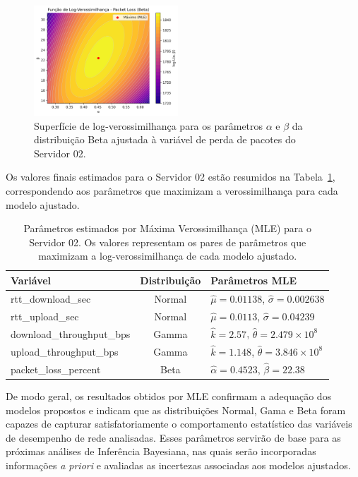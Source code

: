 \documentclass{article}
\begin{document}
\begin{figure}[htp]
	\centering
	\includegraphics[width=0.48\textwidth]{../figures/mle/packet_loss_loglik_surface_beta_server02.png}
	\caption{Superfície de log-verossimilhança para os parâmetros $\alpha$ e $\beta$ da distribuição Beta ajustada à variável de perda de pacotes do Servidor 02.}
	\label{fig:packet_loss_loglik_surface_beta_server02}
\end{figure}

Os valores finais estimados para o Servidor 02 estão resumidos na
Tabela~\ref{tab:mle_parameters_server02},
correspondendo aos parâmetros que maximizam a verossimilhança para cada modelo ajustado.

\begin{table}[htp]
	\centering
	\caption{Parâmetros estimados por Máxima Verossimilhança (MLE) para o Servidor 02. Os valores representam os pares de parâmetros que maximizam a log-verossimilhança de cada modelo ajustado.}
	\label{tab:mle_parameters_server02}
	\begin{tabular}{|l|c|l|}
		\hline
		\textbf{Variável} & \textbf{Distribuição} & \textbf{Parâmetros MLE} \\
		\hline
		rtt\_download\_sec & Normal & $\hat{\mu}=0.01138$, $\hat{\sigma}=0.002638$ \\
		\hline
		rtt\_upload\_sec & Normal & $\hat{\mu}=0.0113$, $\hat{\sigma}=0.04239$ \\
		\hline
		download\_throughput\_bps & Gamma & $\hat{k}=2.57$, $\hat{\theta}=2.479 \times 10^8$ \\
		\hline
		upload\_throughput\_bps & Gamma & $\hat{k}=1.148$, $\hat{\theta}=3.846 \times 10^8$ \\
		\hline
		packet\_loss\_percent & Beta & $\hat{\alpha}=0.4523$, $\hat{\beta}=22.38$ \\
		\hline
	\end{tabular}
\end{table}

De modo geral, os resultados obtidos por MLE confirmam a adequação dos modelos propostos
e indicam que as distribuições Normal, Gama e Beta foram capazes de capturar satisfatoriamente
o comportamento estatístico das variáveis de desempenho de rede analisadas.
Esses parâmetros servirão de base para as próximas análises de Inferência Bayesiana,
nas quais serão incorporadas informações \textit{a priori} e avaliadas as incertezas associadas
aos modelos ajustados.
\end{document}
